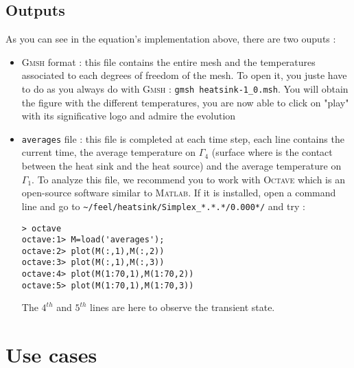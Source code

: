 \subsection{Outputs}
As you can see in the equation's implementation above, there are two ouputs :
\begin{itemize}
\item \textsc{Gmsh} format : this file contains the entire mesh and the temperatures associated to each degrees of freedom of the mesh. To open it, you juste have to do as you always do with \textsc{Gmsh} : \lstinline!gmsh heatsink-1_0.msh!. You will obtain the figure with the different temperatures, you are now able to click on "play" with its significative logo and admire the evolution

\item \lstinline!averages! file : this file is completed at each time step, each line contains the current time, the average temperature on $\Gamma_4$ (surface where is the contact between the heat sink and the heat source) and the average temperature on $\Gamma_1$. To analyze this file, we recommend you to work with \textsc{Octave} which is an open-source software similar to \textsc{Matlab}. If it is installed, open a command line and go to \lstinline!~/feel/heatsink/Simplex_*.*.*/0.000*/! and try :
\begin{lstlisting}
> octave
octave:1> M=load('averages');
octave:2> plot(M(:,1),M(:,2))
octave:3> plot(M(:,1),M(:,3))
octave:4> plot(M(1:70,1),M(1:70,2))
octave:5> plot(M(1:70,1),M(1:70,3))
\end{lstlisting}

The $4^{th}$ and $5^{th}$ lines are here to observe the transient state.
\end{itemize}


\section{Use cases}
